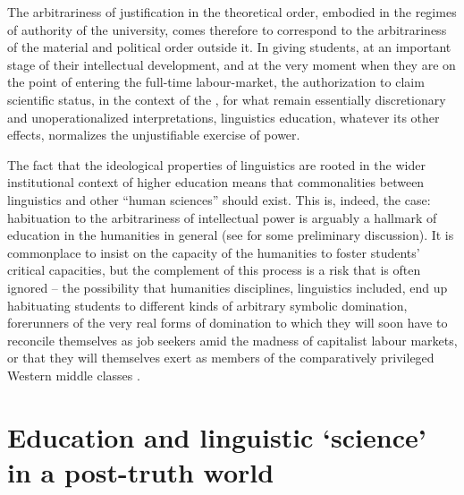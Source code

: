 \documentclass[output=paper]{langscibook}
\begin{document}
The arbitrariness of justification in the theoretical order, embodied in the regimes of authority of the university, comes therefore to correspond to the arbitrariness of the material and political order outside it. In giving students, at an important stage of their intellectual development, and at the very moment when they are on the point of entering the full-time labour-market, the authorization to claim scientific status, in the context of the , for what remain essentially discretionary and unoperationalized interpretations, linguistics education, whatever its other effects, normalizes the unjustifiable exercise of power.

The fact that the ideological properties of linguistics are rooted in the wider institutional context of higher education means that commonalities between linguistics and other ``human sciences'' should exist. This is, indeed, the case: habituation to the arbitrariness of intellectual power is arguably a hallmark of education in the humanities in general (see \citealt{Riemer2016} for some preliminary discussion). It is commonplace to insist on the capacity of the humanities to foster students' critical capacities, but the complement of this process is a risk that is often ignored -- the possibility that humanities disciplines, linguistics included, end up habituating students to different kinds of arbitrary symbolic domination, forerunners of the very real forms of domination to which they will soon have to reconcile themselves as job seekers amid the madness of capitalist labour markets, or that they will themselves exert as members of the comparatively privileged Western middle classes \citep[see][]{Pinsker2015}.

\section{Education and linguistic ‘science’ in a post-truth world}
\label{sec:riemer:education}
\end{document}
